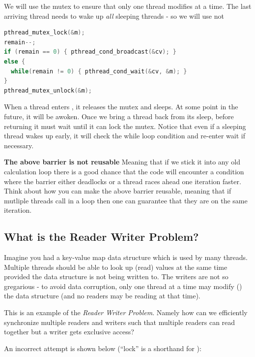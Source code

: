 We will use the mutex to ensure that only one thread modifies  at a time. The last arriving thread needs to wake up \emph{all} sleeping threads - so we will use  not 

\begin{lstlisting}[language=C]
pthread_mutex_lock(&m);
remain--; 
if (remain == 0) { pthread_cond_broadcast(&cv); }
else {
  while(remain != 0) { pthread_cond_wait(&cv, &m); }
}
pthread_mutex_unlock(&m);
\end{lstlisting}

When a thread enters , it releases the mutex and sleeps. At some point in the future, it will be awoken. Once we bring a thread back from its sleep, before returning it must wait until it can lock the mutex. Notice that even if a sleeping thread wakes up early, it will check the while loop condition and re-enter wait if necessary.

\textbf{The above barrier is not reusable} Meaning that if we stick it into any old calculation loop there is a good chance that the code will encounter a condition where the barrier either deadlocks or a thread races ahead one iteration faster. Think about how you can make the above barrier reusable, meaning that if mutliple threads call  in a loop then one can guarantee that they are on the same iteration.

\subsection{What is the Reader Writer Problem?}\label{what-is-the-reader-writer-problem}

Imagine you had a key-value map data structure which is used by many threads. Multiple threads should be able to look up (read) values at the same time provided the data structure is not being written to. The writers are not so gregarious - to avoid data corruption, only one thread at a time may modify () the data structure (and no readers may be reading at that time).

This is an example of the \emph{Reader Writer Problem}. Namely how can we efficiently synchronize multiple readers and writers such that multiple readers can read together but a writer gets exclusive access?

An incorrect attempt is shown below (``lock'' is a shorthand for ):

